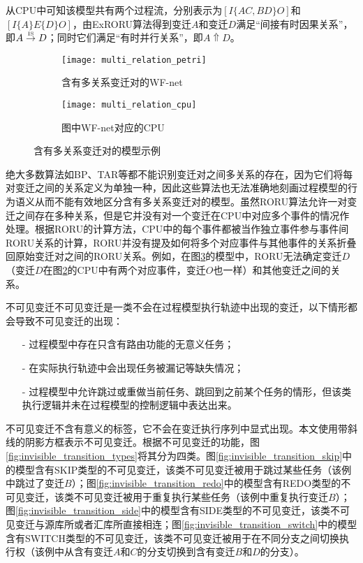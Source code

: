 从CPU中可知该模型共有两个过程流，分别表示为$[I\{AC,BD\}O]$和$[I\{A\}E\{D\}O]$，由ExRORU算法得到变迁$A$和变迁$D$满足“间接有时因果关系”，即$A\overset{\text{\tiny{IS}}}{\rightarrow}D$；同时它们满足“有时并行关系”，即$A\Uparrow D$。

\begin{figure}[htbp]
  \centering
  \begin{subfigure}{1\textwidth}
    \centering
    \texttt{[image: multi\_relation\_petri]}
    \caption{含有多关系变迁对的WF-net}
    \label{fig:multi_relation_petri}
  \end{subfigure}
  \begin{subfigure}{1\textwidth}
    \vspace{1em}
    \centering
    \texttt{[image: multi\_relation\_cpu]}
    \caption{图中WF-net对应的CPU}
    \label{fig:multi_relation_cpu}
  \end{subfigure}
  \vspace{6pt}
  \caption{含有多关系变迁对的模型示例}
  \label{fig:multi_relation}
\end{figure}

绝大多数算法如BP、TAR等都不能识别变迁对之间多关系的存在，因为它们将每对变迁之间的关系定义为单独一种，因此这些算法也无法准确地刻画过程模型的行为语义从而不能有效地区分含有多关系变迁对的模型。虽然RORU算法允许一对变迁之间存在多种关系，但是它并没有对一个变迁在CPU中对应多个事件的情况作处理。根据RORU的计算方法，CPU中的每个事件都被当作独立事件参与事件间RORU关系的计算，RORU并没有提及如何将多个对应事件与其他事件的关系折叠回原始变迁对之间的RORU关系。例如，在图\ref{fig:multi_relation}的模型中，RORU无法确定变迁$D$（变迁$D$在图\ref{fig:multi_relation_cpu}的CPU中有两个对应事件，变迁$O$也一样）和其他变迁之间的关系。

{\heiti 不可见变迁\qquad}不可见变迁是一类不会在过程模型执行轨迹中出现的变迁，以下情形都会导致不可见变迁的出现：
\begin{itemize}
  \item[-] 过程模型中存在只含有路由功能的无意义任务；
  \item[-] 在实际执行轨迹中会出现任务被漏记等缺失情况；
  \item[-] 过程模型中允许跳过或重做当前任务、跳回到之前某个任务的情形，但该类执行逻辑并未在过程模型的控制逻辑中表达出来。
\end{itemize}
不可见变迁不含有意义的标签，它不会在变迁执行序列中显式出现。本文使用带斜线的阴影方框表示不可见变迁。根据不可见变迁的功能，图\ref{fig:invisible_transition_types}将其分为四类。图\ref{fig:invisible_transition_skip}中的模型含有SKIP类型的不可见变迁，该类不可见变迁被用于跳过某些任务（该例中跳过了变迁$B$）；图\ref{fig:invisible_transition_redo}中的模型含有REDO类型的不可见变迁，该类不可见变迁被用于重复执行某些任务（该例中重复执行变迁$B$）；图\ref{fig:invisible_transition_side}中的模型含有SIDE类型的不可见变迁，该类不可见变迁与源库所或者汇库所直接相连；图\ref{fig:invisible_transition_switch}中的模型含有SWITCH类型的不可见变迁，该类不可见变迁被用于在不同分支之间切换执行权（该例中从含有变迁$A$和$C$的分支切换到含有变迁$B$和$D$的分支）。

